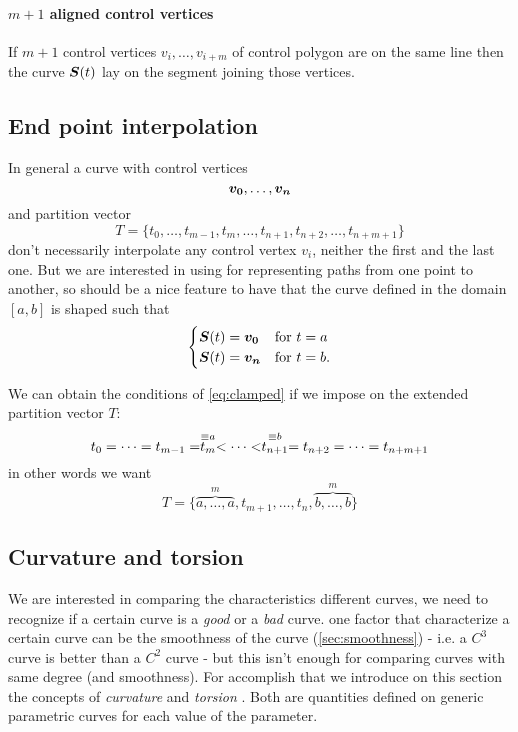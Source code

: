 \documentclass[dissertation.tex]{subfiles}
\begin{document}
\paragraph{$m+1$ aligned control vertices}
If $m+1$ control vertices $v_i,\dots,v_{i+m}$ of control polygon are on the same line then
the curve $\boldsymbol{S}(t)$ lay on the segment joining those vertices.

\subsection{End point interpolation}\label{sec:clamped}
In general a \bs curve with control vertices
\begin{equation*}
  \boldsymbol{v_0}, \dots, \boldsymbol{v_n}
\end{equation*}
and partition vector
\begin{equation*}
  T=\{t_0,\dots,t_{m-1},t_{m},\dots,t_{n+1},t_{n+2},\dots,t_{n+m+1}\}
\end{equation*}
don't necessarily interpolate any control vertex $v_i$, neither the
first and the last one. But we are
interested in using \bs for representing paths from one point to
another, so should be a nice feature to have that the curve defined in
the domain $[a,b]$ is shaped such that
\begin{equation}\label{eq:clamped}
  \begin{cases}
    \boldsymbol{S}(t)=\boldsymbol{v_0}& \text{for } t=a\\
    \boldsymbol{S}(t)=\boldsymbol{v_n}& \text{for } t=b.
  \end{cases}
\end{equation}

We can obtain the conditions of \cref{eq:clamped} if we impose on the
extended partition vector $T$:
\begin{equation*}
  t_0=\dots= t_{m-1}= \stackrel{\equiv a}{t_{m}}<\dots<
\stackrel{\equiv b}{t_{n+1}}= t_{n+2}=\dots= t_{n+m+1}
\end{equation*}
in other words we want
\begin{equation*}
  T=\{\overbrace{a,\dots,a}^m,t_{m+1},\dots,t_{n},\overbrace{b,\dots,b}^m\}
\end{equation*}

\subsection{Curvature and
  torsion}
We are interested in comparing the characteristics different curves,
we need to recognize if a certain curve is a \emph{good} or a
\emph{bad} curve. one factor that characterize a certain curve can 
be the smoothness of the curve (\cref{sec:smoothness}) - i.e. a $C^3$ curve
is better than a $C^2$ curve - but this isn't
enough for comparing curves with same degree (and smoothness). For
accomplish that we
introduce on this section the concepts of \emph{curvature} and
\emph{torsion} \cite{docarmo}. Both are quantities defined on generic
parametric curves for each value of the parameter.
\end{document}
